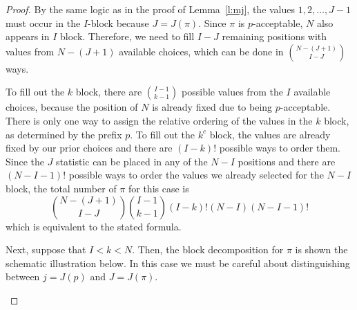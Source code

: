 \documentclass[11pt]{amsart}   %
\theoremstyle{definition}
\theoremstyle{remark}
\numberwithin{equation}{section}
\theoremstyle{theorem}
\begin{document}
\begin{proof}
By the same logic as in the proof of Lemma~\ref{l:mj}, the values $1, 2, \ldots, J-1$ must occur in the $I$-block because $J = J(\pi)$.  Since $\pi$ is $p$-acceptable, $N$ also appears in $I$ block.  Therefore, we need to fill $I-J$ remaining positions with values from $N-(J+1)$ available choices, which can be done in $\binom{N-(J+1)}{I-J}$ ways.

To fill out the $k$ block, there are $\binom{I-1}{k-1}$ possible values from the $I$ available choices, because the position of $N$ is already fixed due to being $p$-acceptable. There is only one way to assign the relative ordering of the values in the $k$ block, as determined by the prefix $p$. To fill out the $k^c$ block, the values are already fixed by our prior choices and there are $(I-k)!$ possible ways to order them. Since the $J$ statistic can be placed in any of the $N-I$ positions and there are $(N-I-1)!$ possible ways to order the values we already selected for the $N-I$ block, the total number of $\pi$ for this case is
\[ \binom{N-(J+1)}{I-J} \binom{I-1}{k-1} (I-k)! (N-I) (N-I-1)! \]
which is equivalent to the stated formula.

Next, suppose that $I < k < N$.  Then, the block decomposition for $\pi$ is
shown the schematic illustration below.  In this case we must be careful about
distinguishing between $j = J(p)$ and $J = J(\pi)$.  

\begin{figure}[htbp]
    \centering
{}
\end{figure}
\end{proof}
\end{document}
